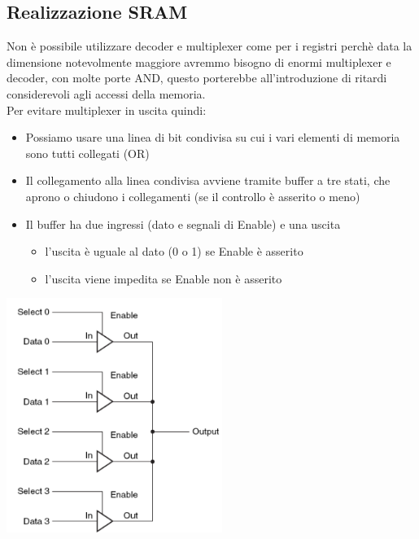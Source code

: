 \documentclass[12pt, a4paper, openany]{book}
\begin{document}
\subsection*{Realizzazione SRAM}
Non è possibile utilizzare decoder e multiplexer come per i registri perchè
data la dimensione notevolmente maggiore avremmo bisogno di enormi multiplexer e decoder,
con molte porte AND, questo porterebbe all'introduzione di ritardi considerevoli agli accessi
della memoria.
\\ Per evitare multiplexer in uscita quindi: \begin{itemize}
    \item Possiamo usare una linea di bit condivisa su cui i vari elementi di memoria
    sono tutti collegati (OR)
    \item Il collegamento alla linea condivisa avviene tramite buffer a tre stati,
    che aprono o chiudono i collegamenti (se il controllo è asserito o meno)
    \item Il buffer ha due ingressi (dato e segnali di Enable) e una uscita
    \begin{itemize}
        \item l'uscita è uguale al dato (0 o 1) se Enable è asserito
        \item l'uscita viene impedita se Enable non è asserito
    \end{itemize} 
\end{itemize}
\begin{center}
    \includegraphics[width=70mm, scale=0.5]{realizzazioneSRAM.png}
\end{center}
\end{document}
